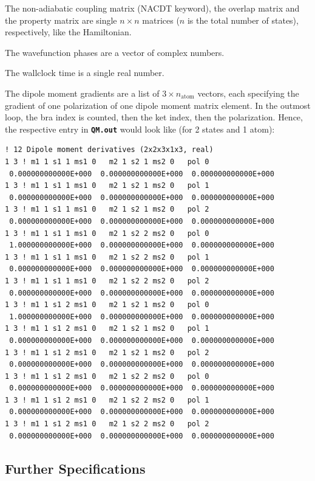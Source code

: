 \documentclass[a4paper,11pt,DIV=15,openany,twoside=false]{scrbook}
\newcommand{\ttt}[1]{\textbf{\texttt{#1}}}
\newenvironment{example}{
  \vspace{0mm}
  \definecolor{shadecolor}{HTML}{BBDDFF}
  \begin{shaded}
  \begin{minipage}{0.9\textwidth}
}{
  \end{minipage}
  \end{shaded}
}
\begin{document}
The non-adiabatic coupling matrix (NACDT keyword), the overlap matrix and the property matrix are single $n\times n$ matrices ($n$ is the total number of states), respectively, like the Hamiltonian. 

The wavefunction phases are a vector of complex numbers.

The wallclock time is a single real number. 

The dipole moment gradients are a list of $3\times n_\text{atom}$ vectors, each specifying the gradient of one polarization of one dipole moment matrix element. In the outmost loop, the bra index is counted, then the ket index, then the polarization. Hence, the respective entry in \ttt{QM.out} would look like (for 2 states and 1 atom):
\begin{example}
  \begin{verbatim}
! 12 Dipole moment derivatives (2x2x3x1x3, real)
1 3 ! m1 1 s1 1 ms1 0   m2 1 s2 1 ms2 0   pol 0
 0.000000000000E+000  0.000000000000E+000  0.000000000000E+000 
1 3 ! m1 1 s1 1 ms1 0   m2 1 s2 1 ms2 0   pol 1
 0.000000000000E+000  0.000000000000E+000  0.000000000000E+000 
1 3 ! m1 1 s1 1 ms1 0   m2 1 s2 1 ms2 0   pol 2
 0.000000000000E+000  0.000000000000E+000  0.000000000000E+000 
1 3 ! m1 1 s1 1 ms1 0   m2 1 s2 2 ms2 0   pol 0
 1.000000000000E+000  0.000000000000E+000  0.000000000000E+000 
1 3 ! m1 1 s1 1 ms1 0   m2 1 s2 2 ms2 0   pol 1
 0.000000000000E+000  0.000000000000E+000  0.000000000000E+000 
1 3 ! m1 1 s1 1 ms1 0   m2 1 s2 2 ms2 0   pol 2
 0.000000000000E+000  0.000000000000E+000  0.000000000000E+000 
1 3 ! m1 1 s1 2 ms1 0   m2 1 s2 1 ms2 0   pol 0
 1.000000000000E+000  0.000000000000E+000  0.000000000000E+000 
1 3 ! m1 1 s1 2 ms1 0   m2 1 s2 1 ms2 0   pol 1
 0.000000000000E+000  0.000000000000E+000  0.000000000000E+000 
1 3 ! m1 1 s1 2 ms1 0   m2 1 s2 1 ms2 0   pol 2
 0.000000000000E+000  0.000000000000E+000  0.000000000000E+000 
1 3 ! m1 1 s1 2 ms1 0   m2 1 s2 2 ms2 0   pol 0
 0.000000000000E+000  0.000000000000E+000  0.000000000000E+000 
1 3 ! m1 1 s1 2 ms1 0   m2 1 s2 2 ms2 0   pol 1
 0.000000000000E+000  0.000000000000E+000  0.000000000000E+000 
1 3 ! m1 1 s1 2 ms1 0   m2 1 s2 2 ms2 0   pol 2
 0.000000000000E+000  0.000000000000E+000  0.000000000000E+000 
  \end{verbatim}
\end{example}

\subsection{Further Specifications}
\end{document}
